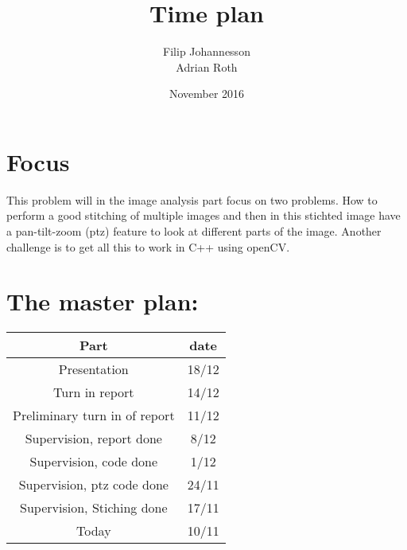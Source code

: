 \documentclass{article}
\title{Time plan}
\author{Filip Johannesson\\ Adrian Roth}
\date{November 2016}
\begin{document}
\maketitle

\section*{Focus}
This problem will in the image analysis part focus on two problems. How to perform a good stitching of multiple images and then in this stichted image have a pan-tilt-zoom (ptz) feature to look at different parts of the image. Another challenge is to get all this to work in C++ using openCV.

\section*{The master plan:}

\begin{center}
  \begin{tabular}{c||c}
  Part &  date\\ \hline
  Presentation & 18/12 \\
  Turn in report & 14/12 \\
  Preliminary turn in of report & 11/12 \\
  Supervision, report done & 8/12 \\
  Supervision, code done & 1/12 \\
  Supervision, ptz code done & 24/11 \\
  Supervision, Stiching done & 17/11 \\
  Today & 10/11
  \end{tabular}
\end{center}
\end{document}
